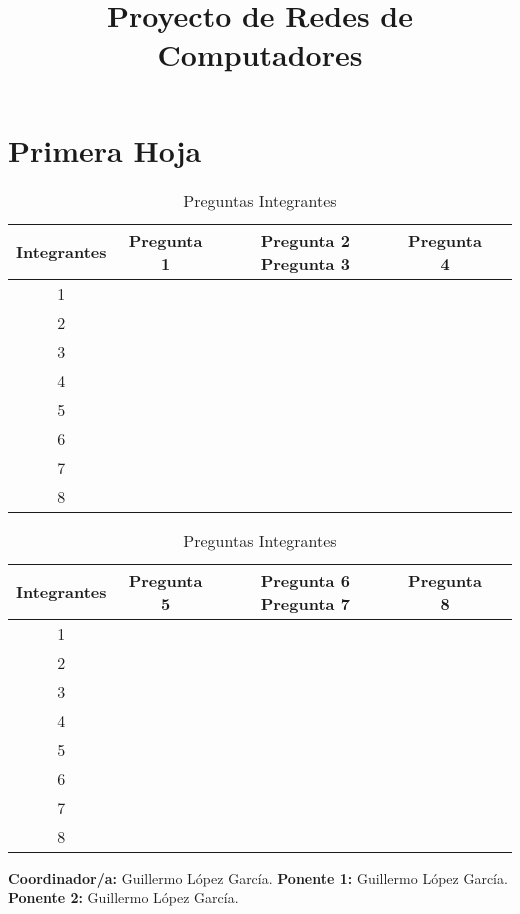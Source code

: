 \documentclass[]{article}
\title{Proyecto de Redes de Computadores}
\author{}
\begin{document}
\maketitle
\newpage

\section{Primera Hoja}
\begin{table}[h!]
  \begin{center}
    \caption{Preguntas Integrantes}
    \begin{tabular}{ccccc}
      \toprule
      \textbf{Integrantes} & \textbf{Pregunta 1} & \textbf{Pregunta 2}
      \textbf{Pregunta 3} & \textbf{Pregunta 4} \\
      \midrule
      1 &  &  \\
      2 &  &  \\
      3 &  &  \\
      4 &  &  \\
      5 &  &  \\
      6 &  &  \\
      7 &  &  \\
      8 &  &  \\
      \bottomrule
    \end{tabular}
  \end{center}
\end{table}

\begin{table}[h!]
  \begin{center}
    \caption{Preguntas Integrantes}
    \begin{tabular}{ccccc}
      \toprule
      \textbf{Integrantes} & \textbf{Pregunta 5} & \textbf{Pregunta 6}
      \textbf{Pregunta 7} & \textbf{Pregunta 8} \\
      \midrule
      1 &  &  \\
      2 &  &  \\
      3 &  &  \\
      4 &  &  \\
      5 &  &  \\
      6 &  &  \\
      7 &  &  \\
      8 &  &  \\
      \bottomrule
    \end{tabular}
  \end{center}
\end{table}

\textbf{Coordinador/a: } Guillermo López García. \newline
\textbf{Ponente 1: } Guillermo López García. \newline
\textbf{Ponente 2: } Guillermo López García.
\end{document}
